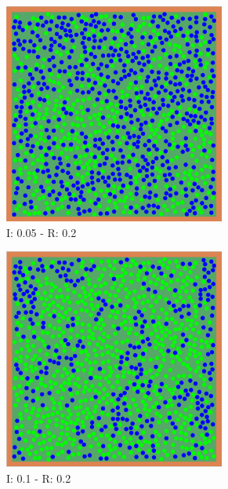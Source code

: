 \begin{figure}[H]
 \centering
 \begin{subfigure}[b]{0.4\textwidth}
     \centering
     \includegraphics[width=0.8\textwidth]{images/2-51a.png}
    \caption{I: 0.05 - R: 0.2}
    \label{fig: 51a}
 \end{subfigure}
 \begin{subfigure}[b]{0.4\textwidth}
      \centering
     \includegraphics[width=0.8\textwidth]{images/2-51b.png}
     \caption{I: 0.1 - R: 0.2}
     \label{fig: 51b}
 \end{subfigure}
 \begin{subfigure}[b]{0.4\textwidth}

\end{subfigure}
\end{figure}
